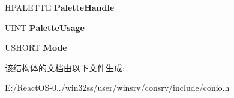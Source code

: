 \begin{DoxyCompactItemize}
\item 
\mbox{\label{struct___c_o_n_s_o_l_e___s_c_r_e_e_n___b_u_f_f_e_r_af2f3c2826145235294c207066bdb45fc}} 
H\+P\+A\+L\+E\+T\+TE {\bfseries Palette\+Handle}
\item 
\mbox{\label{struct___c_o_n_s_o_l_e___s_c_r_e_e_n___b_u_f_f_e_r_ad0f4e3cdcb159a66c073279ed4d407b8}} 
U\+I\+NT {\bfseries Palette\+Usage}
\item 
\mbox{\label{struct___c_o_n_s_o_l_e___s_c_r_e_e_n___b_u_f_f_e_r_a2cd585ddae0a900995ab8a3972e30fb4}} 
U\+S\+H\+O\+RT {\bfseries Mode}
\end{DoxyCompactItemize}


该结构体的文档由以下文件生成\+:\begin{DoxyCompactItemize}
\item 
E\+:/\+React\+O\+S-\/0../win32ss/user/winsrv/consrv/include/conio.\+h\end{DoxyCompactItemize}
